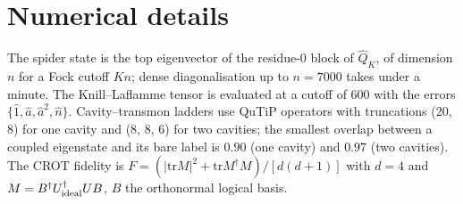 \documentclass[aps,pra,reprint,superscriptaddress,amsmath,amssymb,nofootinbib]{revtex4-2}
\newcommand{\revtexfallback}{0}%
\newcommand{\revtexfallback}{1}%
\newcommand{\n}{\hat n}
\begin{document}
\section{Numerical details}\label{app:num}
The spider state is the top eigenvector of the residue-0 block of $\hat Q_K$,
of dimension $n$ for a Fock cutoff $Kn$; dense diagonalisation up to $n=7000$
takes under a minute. The Knill--Laflamme tensor is evaluated at a cutoff of
600 with the errors $\{\hat1,\hat a,\hat a^2,\n\}$. Cavity--transmon ladders
use QuTiP operators with truncations (20, 8) for one cavity and (8, 8, 6) for
two cavities; the smallest overlap between a coupled eigenstate and its bare
label is $0.90$ (one cavity) and $0.97$ (two cavities). The CROT fidelity is
$F=(|\mathrm{tr}M|^2+\mathrm{tr}M^\dagger M)/[d(d+1)]$ with $d=4$ and
$M=B^\dagger U_{\rm ideal}^\dagger U B$, $B$ the orthonormal logical basis.



\end{document}

